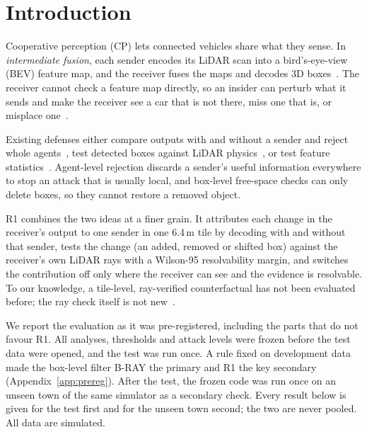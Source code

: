 \documentclass[conference]{IEEEtran}
\begin{document}
\section{Introduction}
Cooperative perception (CP) lets connected vehicles share what they sense. In \emph{intermediate fusion},
each sender encodes its LiDAR scan into a bird's-eye-view (BEV) feature map, and the receiver fuses the maps
and decodes 3D boxes~\cite{xu2022opv2v,hu2022where2comm,xu2022v2xvit}. The receiver cannot check a feature
map directly, so an insider can perturb what it sends and make the receiver see a car that is not there,
miss one that is, or misplace one~\cite{tu2021adversarial,zhang2024cad,wang2025lucia,zhang2026poseguard}.

Existing defenses either compare outputs with and without a sender and reject whole
agents~\cite{li2023robosac,zhao2024made,hu2025cpguard,tao2026gcp}, test detected boxes against LiDAR
physics~\cite{sun2020carlo,hau2021shadowcatcher,zhang2024cad}, or test feature
statistics~\cite{zhang2026latentguardian}. Agent-level rejection discards a sender's useful information
everywhere to stop an attack that is usually local, and box-level free-space checks can only delete boxes, so
they cannot restore a removed object.

R1 combines the two ideas at a finer grain. It attributes each change in the receiver's output to one sender in
one 6.4\,m tile by decoding with and without that sender, tests the change (an added, removed or shifted box)
against the receiver's own LiDAR rays with a Wilson-95 resolvability margin, and switches the contribution off
only where the receiver can see and the evidence is resolvable. To our knowledge, a tile-level, ray-verified
counterfactual has not been evaluated before; the ray check itself is not new~\cite{sun2020carlo,zhang2024cad}.

We report the evaluation as it was pre-registered, including the parts that do not favour R1. All analyses,
thresholds and attack levels were frozen before the test data were opened, and the test was run once. A rule
fixed on development data made the box-level filter B-RAY the primary and R1 the key secondary
(Appendix~\ref{app:prereg}). After the test, the frozen code was run once on an unseen town of the same
simulator as a secondary check. Every result below is given for the test first and for the unseen town second;
the two are never pooled. All data are simulated.
\end{document}
